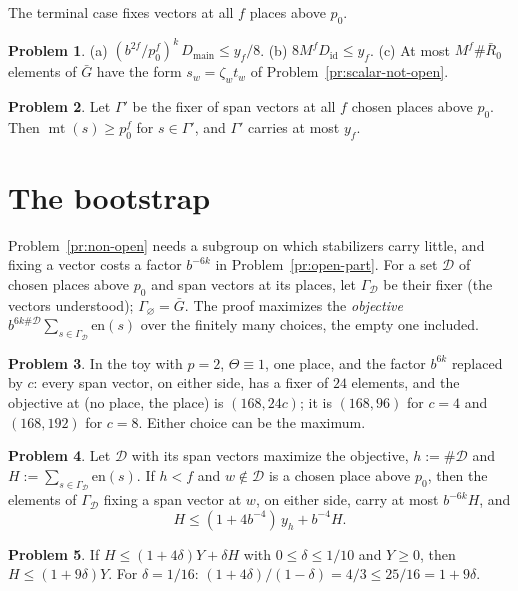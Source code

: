 \documentclass[reqno]{amsart}
\theoremstyle{definition}
\newtheorem{problem}{Problem}[section]
\theoremstyle{plain}
\theoremstyle{remark}
\newcommand{\Gb}{\bar G}
\newcommand{\Rb}{\bar R_0}
\newcommand{\Dc}{\mathcal D}
\newcommand{\en}{\mathrm{en}}
\newcommand{\Did}{D_{\mathrm{id}}}
\newcommand{\Dmain}{D_{\mathrm{main}}}
\newcommand{\mt}{\operatorname{mt}}
\begin{document}
The terminal case fixes vectors at all \(f\) places above \(p_0\).

\begin{problem}\label{pr:terminal-sizes}
(a) \((b^{2f}/p_0^f)^k\,\Dmain\le y_f/8\).  (b) \(8M^f\Did\le y_f\).  (c) At most \(M^f\#\Rb\) elements of \(\Gb\) have the form \(s_w=\zeta_wt_w\) of Problem~\ref{pr:scalar-not-open}.
\end{problem}

\begin{problem}\label{pr:terminal}
Let \(\Gamma'\) be the fixer of span vectors at all \(f\) chosen places above \(p_0\).  Then \(\mt(s)\ge p_0^f\) for \(s\in\Gamma'\), and \(\Gamma'\) carries at most \(y_f\).
\end{problem}

\section{The bootstrap}\label{sec:bootstrap}

Problem~\ref{pr:non-open} needs a subgroup on which stabilizers carry little, and fixing a vector costs a factor \(b^{-6k}\) in Problem~\ref{pr:open-part}.  For a set \(\Dc\) of chosen places above \(p_0\) and span vectors at its places, let \(\Gamma_{\Dc}\) be their fixer (the vectors understood); \(\Gamma_\varnothing=\Gb\).  The proof maximizes the \emph{objective} \(b^{6k\#\Dc}\sum_{s\in\Gamma_{\Dc}}\en(s)\) over the finitely many choices, the empty one included.

\begin{problem}\label{pr:bootstrap-toy}
In the toy with \(p=2\), \(\Theta\equiv1\), one place, and the factor \(b^{6k}\) replaced by \(c\): every span vector, on either side, has a fixer of \(24\) elements, and the objective at (no place, the place) is \((168,24c)\); it is \((168,96)\) for \(c=4\) and \((168,192)\) for \(c=8\).  Either choice can be the maximum.
\end{problem}

\begin{problem}\label{pr:bootstrap}
Let \(\Dc\) with its span vectors maximize the objective, \(h:=\#\Dc\) and \(H:=\sum_{s\in\Gamma_{\Dc}}\en(s)\).  If \(h<f\) and \(w\notin\Dc\) is a chosen place above \(p_0\), then the elements of \(\Gamma_{\Dc}\) fixing a span vector at \(w\), on either side, carry at most \(b^{-6k}H\), and
\[
 H\le(1+4b^{-4})\,y_h+b^{-4}H .
\]
\end{problem}

\begin{problem}\label{pr:absorb}
If \(H\le(1+4\delta)Y+\delta H\) with \(0\le\delta\le1/10\) and \(Y\ge0\), then \(H\le(1+9\delta)Y\).  For \(\delta=1/16\): \((1+4\delta)/(1-\delta)=4/3\le25/16=1+9\delta\).
\end{problem}
\end{document}

